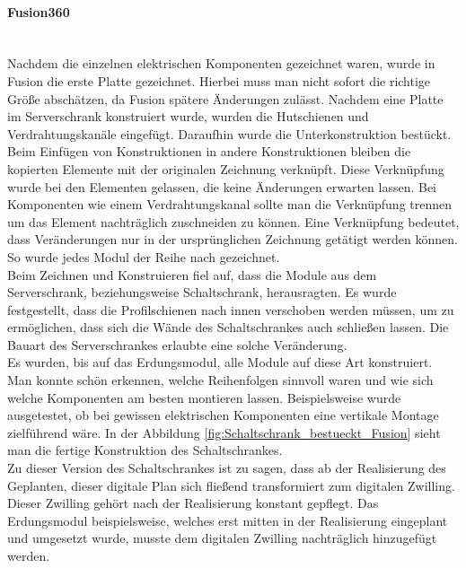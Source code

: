     \paragraph{Fusion360}\mbox{}\\
    Nachdem die einzelnen elektrischen Komponenten gezeichnet waren, wurde in Fusion die erste Platte gezeichnet. Hierbei muss man nicht sofort die richtige Größe abschätzen, da Fusion spätere Änderungen zulässt. Nachdem eine Platte im Serverschrank konstruiert wurde, wurden die Hutschienen und Verdrahtungskanäle eingefügt. Daraufhin wurde die Unterkonstruktion bestückt. Beim Einfügen von Konstruktionen in andere Konstruktionen bleiben die kopierten Elemente mit der originalen Zeichnung verknüpft. Diese Verknüpfung wurde bei den Elementen gelassen, die keine Änderungen erwarten lassen. Bei Komponenten wie einem Verdrahtungskanal sollte man die Verknüpfung trennen um das Element nachträglich zuschneiden zu können. Eine Verknüpfung bedeutet, dass Veränderungen nur in der ursprünglichen Zeichnung getätigt werden können. So wurde jedes Modul der Reihe nach gezeichnet.\\
    Beim Zeichnen und Konstruieren fiel auf, dass die Module aus dem Serverschrank, beziehungsweise Schaltschrank, herausragten. Es wurde festgestellt, dass die Profilschienen nach innen verschoben werden müssen, um zu ermöglichen, dass sich die Wände des Schaltschrankes auch schließen lassen. Die Bauart des Serverschrankes erlaubte eine solche Veränderung.\\ 
    Es wurden, bis auf das Erdungsmodul, alle Module auf diese Art konstruiert. Man konnte schön erkennen, welche Reihenfolgen sinnvoll waren und wie sich welche Komponenten am besten montieren lassen. Beispielsweise wurde ausgetestet, ob bei gewissen elektrischen Komponenten eine vertikale Montage zielführend wäre. In der Abbildung \ref{fig:Schaltschrank_bestueckt_Fusion} sieht man die fertige Konstruktion des Schaltschrankes.\\
    Zu dieser Version des Schaltschrankes ist zu sagen, dass ab der Realisierung des Geplanten, dieser digitale Plan sich fließend transformiert zum digitalen Zwilling. Dieser Zwilling gehört nach der Realisierung konstant gepflegt. Das Erdungsmodul beispielsweise, welches erst mitten in der Realisierung eingeplant und umgesetzt wurde, musste dem digitalen Zwilling nachträglich hinzugefügt werden.
